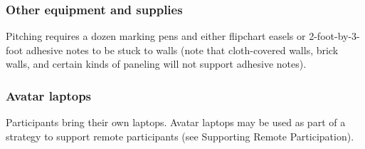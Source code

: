 \documentclass[letterpaper,11pt]{texMemo}
\begin{document}
\subsubsection*{Other equipment and supplies} 
Pitching requires a dozen marking pens and either flipchart easels or 2-foot-by-3-foot adhesive notes to be stuck to walls (note that cloth-covered walls, brick walls, and certain kinds of paneling will not support adhesive notes). 
\subsubsection*{Avatar laptops} 
Participants bring their own laptops. Avatar laptops may be used as part of a strategy to support remote participants (see Supporting Remote Participation). 
\end{document}
